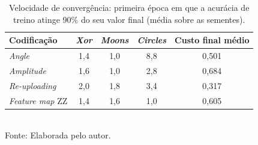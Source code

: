\begin{table}[htb]
\centering
\caption{Velocidade de convergência: primeira época em que a acurácia de treino atinge 90\% do seu valor final (média sobre as sementes).}
\label{tab:convergencia}
\begin{tabular}{lcccc}
\hline
Codificação & \textit{Xor} & \textit{Moons} & \textit{Circles} & Custo final médio \\
\hline
\textit{Angle} & 1,4 & 1,0 & 8,8 & 0,501 \\
\textit{Amplitude} & 1,6 & 1,0 & 2,8 & 0,684 \\
\textit{Re-uploading} & 2,0 & 1,8 & 3,4 & 0,317 \\
\textit{Feature map} ZZ & 1,4 & 1,6 & 1,0 & 0,605 \\
\hline
\end{tabular}
\\[2pt]
{\footnotesize Fonte: Elaborada pelo autor.}
\end{table}

